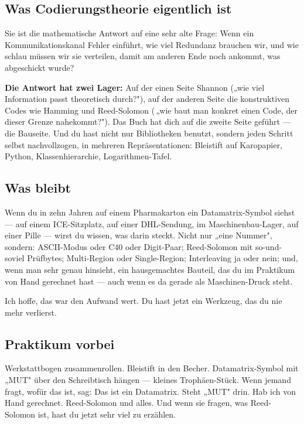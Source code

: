 \subsection*{Was Codierungstheorie eigentlich ist}

Sie ist die mathematische Antwort auf eine sehr alte Frage: Wenn ein
Kommunikationskanal Fehler einführt, wie viel Redundanz brauchen wir,
und wie schlau müssen wir sie verteilen, damit am anderen Ende noch
ankommt, was abgeschickt wurde?

\textbf{Die Antwort hat zwei Lager:} Auf der einen Seite Shannon
(„wie viel Information passt theoretisch durch?"), auf der anderen
Seite die konstruktiven Codes wie Hamming und Reed-Solomon (\,„wie
baut man konkret einen Code, der dieser Grenze nahekommt?"). Das Buch
hat dich auf die zweite Seite geführt — die Bauseite. Und du hast
nicht nur Bibliotheken benutzt, sondern jeden Schritt selbst
nachvollzogen, in mehreren Repräsentationen: Bleistift auf
Karopapier, Python, Klassenhierarchie, Logarithmen-Tafel.

\subsection*{Was bleibt}

Wenn du in zehn Jahren auf einem Pharmakarton ein Datamatrix-Symbol
siehst — auf einem ICE-Sitzplatz, auf einer DHL-Sendung, im
Maschinenbau-Lager, auf einer Pille — wirst du wissen, was darin
steckt. Nicht nur „eine Nummer", sondern: ASCII-Modus oder C40 oder
Digit-Paar; Reed-Solomon mit so-und-soviel Prüfbytes; Multi-Region
oder Single-Region; Interleaving ja oder nein; und, wenn man sehr
genau hinsieht, ein hausgemachtes Bauteil, das du im Praktikum von
Hand gerechnet hast — auch wenn es da gerade als Maschinen-Druck steht.

Ich hoffe, das war den Aufwand wert. Du hast jetzt ein Werkzeug,
das du nie mehr verlierst.

\subsection*{Praktikum vorbei}

Werkstattbogen zusammenrollen. Bleistift in den Becher. Datamatrix-Symbol
mit „MUT" über den Schreibtisch hängen — kleines Trophäen-Stück.
Wenn jemand fragt, wofür das ist, sag: \glqq Das ist ein Datamatrix.
Steht „MUT" drin. Hab ich von Hand gerechnet. Reed-Solomon und alles.\grqq{}
Und wenn sie fragen, was Reed-Solomon ist, hast du jetzt sehr viel zu
erzählen.
